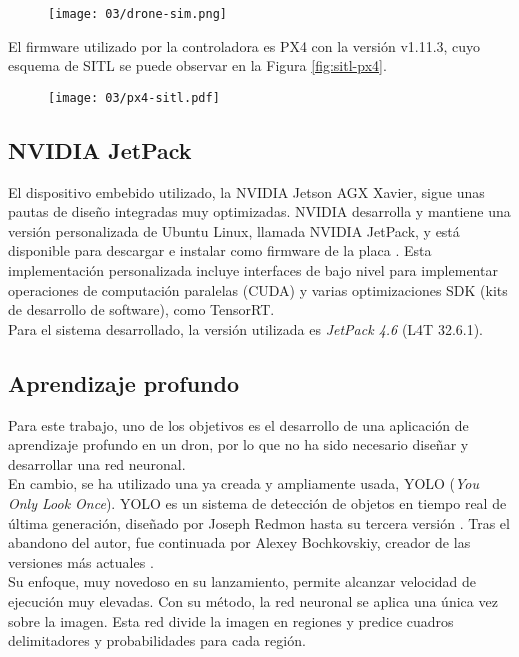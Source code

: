 \documentclass[../main.tex]{subfiles}
\begin{document}
\begin{figure}[!ht]
 	{\texttt{[image: 03/drone-sim.png]}}
\end{figure}

\newpage
El firmware utilizado por la controladora es PX4 con la versión v1.11.3, cuyo esquema de SITL se puede observar en la Figura \ref{fig:sitl-px4}. 

\begin{figure}[!ht]
 	{\texttt{[image: 03/px4-sitl.pdf]}}
\end{figure}

\subsection{NVIDIA JetPack} \label{section:met-jetpack}
El dispositivo embebido utilizado, la NVIDIA Jetson AGX Xavier, sigue unas pautas de diseño integradas muy optimizadas. NVIDIA desarrolla y mantiene una versión personalizada de Ubuntu Linux, llamada NVIDIA JetPack, y está disponible para descargar e instalar como firmware de la placa \cite{jetpack}. Esta implementación personalizada incluye interfaces de bajo nivel para implementar operaciones de computación paralelas (CUDA) y varias optimizaciones SDK (kits de desarrollo de software), como TensorRT. \\
Para el sistema desarrollado, la versión utilizada es \textit{JetPack 4.6} (L4T 32.6.1).

\subsection{Aprendizaje profundo}\label{section:met-aprend}
Para este trabajo, uno de los objetivos es el desarrollo de una aplicación de aprendizaje profundo en un dron, por lo que no ha sido necesario diseñar y desarrollar una red neuronal. \\
En cambio, se ha utilizado una ya creada y ampliamente usada, YOLO (\emph{You Only Look Once}). YOLO es un sistema de detección de objetos en tiempo real de última generación, diseñado por Joseph Redmon hasta su tercera versión \cite{yolov3}. Tras el abandono del autor, fue continuada por Alexey Bochkovskiy, creador de las versiones más actuales \cite{bochkovskiy2020yolov4}. \\
Su enfoque, muy novedoso en su lanzamiento, permite alcanzar velocidad de ejecución muy elevadas. Con su método, la red neuronal se aplica una única vez sobre la imagen. Esta red divide la imagen en regiones y predice cuadros delimitadores y probabilidades para cada región.
\end{document}
